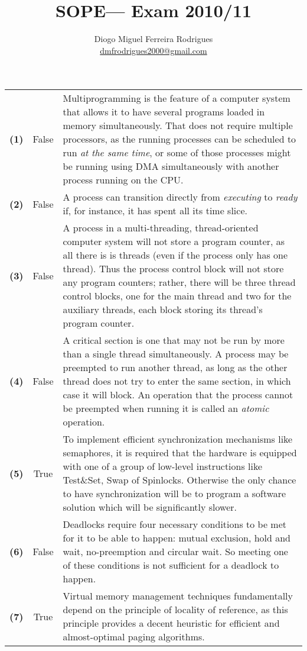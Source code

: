 \documentclass{sope}
\title{SOPE--- Exam 2010/11}
\author{Diogo Miguel Ferreira Rodrigues \\ \href{mailto:dmfrodrigues2000@gmail.com}{dmfrodrigues2000@gmail.com}}
\begin{document}
\setcounter{chapter}{12}
\begin{center} 
    \begin{longtable}{c | c p{132mm}}
        \textbf{(1)} & False & Multiprogramming is the feature of a computer system that allows it to have several programs loaded in memory simultaneously. That does not require multiple processors, as the running processes can be scheduled to run \emph{at the same time}, or some of those processes might be running using DMA simultaneously with another process running on the CPU. \\
        \textbf{(2)} & False & A process can transition directly from \emph{executing} to \emph{ready} if, for instance, it has spent all its time slice. \\
        \textbf{(3)} & False & A process in a multi-threading, thread-oriented computer system will not store a program counter, as all there is is threads (even if the process only has one thread). Thus the process control block will not store any program counters; rather, there will be three thread control blocks, one for the main thread and two for the auxiliary threads, each block storing its thread's program counter. \\
        \textbf{(4)} & False & A critical section is one that may not be run by more than a single thread simultaneously. A process may be preempted to run another thread, as long as the other thread does not try to enter the same section, in which case it will block. An operation that the process cannot be preempted when running it is called an \emph{atomic} operation. \\
        \textbf{(5)} & True & To implement efficient synchronization mechanisms like semaphores, it is required that the hardware is equipped with one of a group of low-level instructions like Test\&Set, Swap of Spinlocks. Otherwise the only chance to have synchronization will be to program a software solution which will be significantly slower. \\
        \textbf{(6)} & False & Deadlocks require four necessary conditions to be met for it to be able to happen: mutual exclusion, hold and wait, no-preemption and circular wait. So meeting one of these conditions is not sufficient for a deadlock to happen. \\
        \textbf{(7)} & True & Virtual memory management techniques fundamentally depend on the principle of locality of reference, as this principle provides a decent heuristic for efficient and almost-optimal paging algorithms. \\

\end{longtable}
\end{center}
\end{document}
